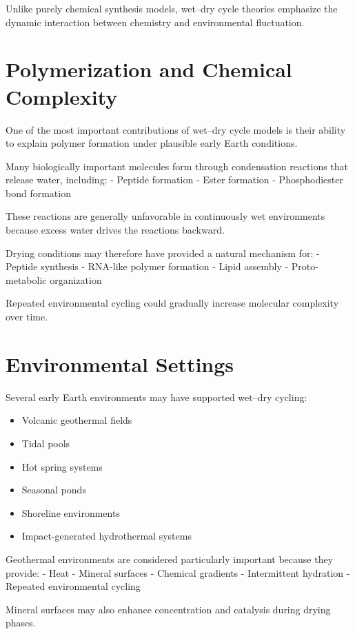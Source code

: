 \documentclass[
  oneside]{book}
\providecommand{\tightlist}{%
  \setlength{\itemsep}{0pt}\setlength{\parskip}{0pt}}
\begin{document}
Unlike purely chemical synthesis models, wet--dry cycle theories emphasize the dynamic interaction between chemistry and environmental fluctuation.

\section{Polymerization and Chemical Complexity}\label{polymerization-and-chemical-complexity}

One of the most important contributions of wet--dry cycle models is their ability to explain polymer formation under plausible early Earth conditions.

Many biologically important molecules form through condensation reactions that release water, including:
- Peptide formation
- Ester formation
- Phosphodiester bond formation

These reactions are generally unfavorable in continuously wet environments because excess water drives the reactions backward.

Drying conditions may therefore have provided a natural mechanism for:
- Peptide synthesis
- RNA-like polymer formation
- Lipid assembly
- Proto-metabolic organization

Repeated environmental cycling could gradually increase molecular complexity over time.

\section{Environmental Settings}\label{environmental-settings-1}

Several early Earth environments may have supported wet--dry cycling:

\begin{itemize}
\tightlist
\item
  Volcanic geothermal fields
\item
  Tidal pools
\item
  Hot spring systems
\item
  Seasonal ponds
\item
  Shoreline environments
\item
  Impact-generated hydrothermal systems
\end{itemize}

Geothermal environments are considered particularly important because they provide:
- Heat
- Mineral surfaces
- Chemical gradients
- Intermittent hydration
- Repeated environmental cycling

Mineral surfaces may also enhance concentration and catalysis during drying phases.
\end{document}
